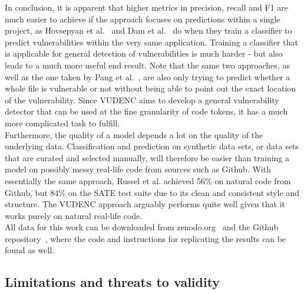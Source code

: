 \documentclass[
a4paper,
pagesize,
pdftex,
12pt,
twoside, %
BCOR=5mm, %
ngerman,
fleqn,
final,
]{scrartcl}
\begin{document}
	In conclusion, it is apparent that higher metrics in precision, recall and F1 are much easier to achieve if the approach focuses on predictions within a single project, as Hovsepyan et al.~\cite{Hovsepyan.2012} and Dam et al.~\cite{Dam.2017} do when they train a classifier to predict vulnerabilities within the very same application. Training a classifier that is applicable for general detection of vulnerabilities is much harder - but also leads to a much more useful end result. Note that the same two approaches, as well as the one taken by Pang et al.~\cite{Pang.2015}, are also only trying to predict whether a whole file is vulnerable or not without being able to point out the exact location of the vulnerability. Since VUDENC aims to develop a general vulnerability detector that can be used at the fine granularity of code tokens, it has a much more complicated task to fulfill.\\	
	Furthermore, the quality of a model depends a lot on the quality of the underlying data. Classification and prediction on synthetic data sets, or data sets that are curated and selected manually, will therefore be easier than training a model on possibly messy real-life code from sources such as Github. With essentially the same approach, Russel et al. achieved 56\% on natural code from Github, but 84\% on the SATE test suite due to its clean and consistent style and structure. The VUDENC approach arguably performs quite well given that it works purely on natural real-life code. \\
	All data for this work can be downloaded from zenodo.org~\cite{Wartschinski.2.12.2019b,Wartschinski.1.12.2019} and the Github repository~\cite{Wartschinski.2.12.2019}, where the code and instructions for replicating the results can be found as well. 
	
	
	\subsection{Limitations and threats to validity}
	
\end{document}
